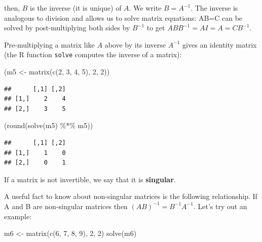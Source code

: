 \documentclass[
  12pt,
]{krantz}
\newenvironment{Shaded}{\begin{snugshade}}{\end{snugshade}}
\newcommand{\DecValTok}[1]{\textcolor[rgb]{0.00,0.00,0.81}{#1}}
\newcommand{\FunctionTok}[1]{\textcolor[rgb]{0.00,0.00,0.00}{#1}}
\newcommand{\NormalTok}[1]{#1}
\newcommand{\OtherTok}[1]{\textcolor[rgb]{0.56,0.35,0.01}{#1}}
\newcommand{\SpecialCharTok}[1]{\textcolor[rgb]{0.00,0.00,0.00}{#1}}
\theoremstyle{definition}
\theoremstyle{definition}
\theoremstyle{definition}
\theoremstyle{definition}
\theoremstyle{remark}
\begin{document}
then, \(B\) is the inverse (it is unique) of \(A\). We write \(B=A^{-1}\). The inverse is analogous to division and allows us to solve matrix equations: AB=C can be solved by post-multiplying both sides by \(B^{-1}\) to get \(ABB^{-1}=AI=A=CB^{-1}\).

Pre-multiplying a matrix like \(A\) above by its inverse \(A^{-1}\) gives an identity matrix (the R function \texttt{solve} computes the inverse of a matrix):

\begin{Shaded}
\begin{Highlighting}[]
\NormalTok{(m5 }\OtherTok{\textless{}{-}} \FunctionTok{matrix}\NormalTok{(}\FunctionTok{c}\NormalTok{(}\DecValTok{2}\NormalTok{, }\DecValTok{3}\NormalTok{, }\DecValTok{4}\NormalTok{, }\DecValTok{5}\NormalTok{), }\DecValTok{2}\NormalTok{, }\DecValTok{2}\NormalTok{))}
\end{Highlighting}
\end{Shaded}

\begin{verbatim}
##      [,1] [,2]
## [1,]    2    4
## [2,]    3    5
\end{verbatim}

\begin{Shaded}
\begin{Highlighting}[]
\NormalTok{(}\FunctionTok{round}\NormalTok{(}\FunctionTok{solve}\NormalTok{(m5) }\SpecialCharTok{\%*\%}\NormalTok{ m5))}
\end{Highlighting}
\end{Shaded}

\begin{verbatim}
##      [,1] [,2]
## [1,]    1    0
## [2,]    0    1
\end{verbatim}

If a matrix is not invertible, we say that it is \textbf{singular}.

A useful fact to know about non-singular matrices is the following relationship. If A and B are non-singular matrices then \((AB)^{-1} = B^{-1}A^{-1}\). Let's try out an example:

\begin{Shaded}
\begin{Highlighting}[]
\NormalTok{m6 }\OtherTok{\textless{}{-}} \FunctionTok{matrix}\NormalTok{(}\FunctionTok{c}\NormalTok{(}\DecValTok{6}\NormalTok{, }\DecValTok{7}\NormalTok{, }\DecValTok{8}\NormalTok{, }\DecValTok{9}\NormalTok{), }\DecValTok{2}\NormalTok{, }\DecValTok{2}\NormalTok{)}
\FunctionTok{solve}\NormalTok{(m6)}
\end{Highlighting}
\end{Shaded}
\end{document}
